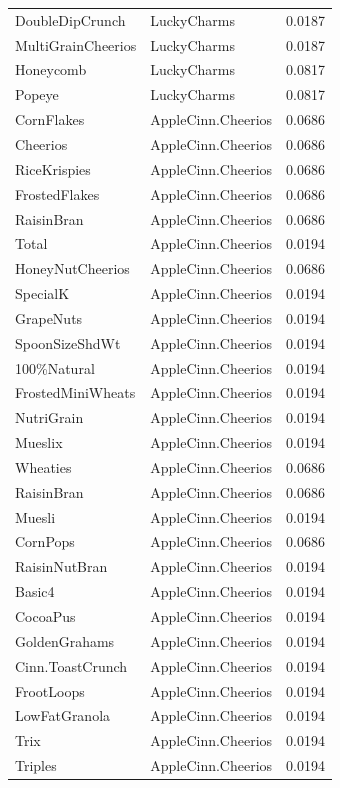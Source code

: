 \begin{table}[!htbp]
\begin{tabular}{lll}
\\
DoubleDipCrunch & LuckyCharms & 0.0187
\\
MultiGrainCheerios & LuckyCharms & 0.0187
\\
Honeycomb & LuckyCharms & 0.0817
\\
Popeye & LuckyCharms & 0.0817
\\
CornFlakes & AppleCinn.Cheerios & 0.0686
\\
Cheerios & AppleCinn.Cheerios & 0.0686
\\
RiceKrispies & AppleCinn.Cheerios & 0.0686
\\
FrostedFlakes & AppleCinn.Cheerios & 0.0686
\\
RaisinBran & AppleCinn.Cheerios & 0.0686
\\
Total & AppleCinn.Cheerios & 0.0194
\\
HoneyNutCheerios & AppleCinn.Cheerios & 0.0686
\\
SpecialK & AppleCinn.Cheerios & 0.0194
\\
GrapeNuts & AppleCinn.Cheerios & 0.0194
\\
SpoonSizeShdWt & AppleCinn.Cheerios & 0.0194
\\
100\%Natural & AppleCinn.Cheerios & 0.0194
\\
FrostedMiniWheats & AppleCinn.Cheerios & 0.0194
\\
NutriGrain & AppleCinn.Cheerios & 0.0194
\\
Mueslix & AppleCinn.Cheerios & 0.0194
\\
Wheaties & AppleCinn.Cheerios & 0.0686
\\
RaisinBran & AppleCinn.Cheerios & 0.0686
\\
Muesli & AppleCinn.Cheerios & 0.0194
\\
CornPops & AppleCinn.Cheerios & 0.0686
\\
RaisinNutBran & AppleCinn.Cheerios & 0.0194
\\
Basic4 & AppleCinn.Cheerios & 0.0194
\\
CocoaPus & AppleCinn.Cheerios & 0.0194
\\
GoldenGrahams & AppleCinn.Cheerios & 0.0194
\\
Cinn.ToastCrunch & AppleCinn.Cheerios & 0.0194
\\
FrootLoops & AppleCinn.Cheerios & 0.0194
\\
LowFatGranola & AppleCinn.Cheerios & 0.0194
\\
Trix & AppleCinn.Cheerios & 0.0194
\\
Triples & AppleCinn.Cheerios & 0.0194
\\

\end{tabular}
\end{table}
